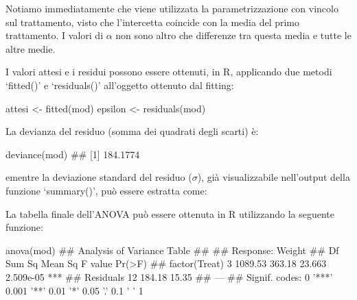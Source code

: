 \documentclass[a4paper,12pt,oneside]{book}
\newenvironment{Shaded}{}{}
\newcommand{\KeywordTok}[1]{#1}
\newcommand{\StringTok}[1]{#1}
\newcommand{\CommentTok}[1]{#1}
\newcommand{\OperatorTok}[1]{#1}
\newcommand{\NormalTok}[1]{#1}
\begin{document}
\normalsize

Notiamo immediatamente che viene utilizzata la parametrizzazione con vincolo sul trattamento, visto che l'intercetta coincide con la media del primo trattamento. I valori di \(\alpha\) non sono altro che differenze tra questa media e tutte le altre medie.

I valori attesi e i residui possono essere ottenuti, in R, applicando due metodi `fitted()' e `residuals()' all'oggetto ottenuto dal fitting:

\begin{Shaded}
\begin{Highlighting}[]
\NormalTok{attesi <-}\StringTok{ }\KeywordTok{fitted}\NormalTok{(mod)}
\NormalTok{epsilon <-}\StringTok{ }\KeywordTok{residuals}\NormalTok{(mod)}
\end{Highlighting}
\end{Shaded}

La devianza del residuo (somma dei quadrati degli scarti) è:

\begin{Shaded}
\begin{Highlighting}[]
\KeywordTok{deviance}\NormalTok{(mod)}
\CommentTok{## [1] 184.1774}
\end{Highlighting}
\end{Shaded}

ementre la deviazione standard del residuo (\(\sigma\)), già visualizzabile nell'output della funzione `summary()', può essere estratta come:

\begin{Shaded}
\end{Shaded}

La tabella finale dell'ANOVA può essere ottenuta in R utilizzando la seguente funzione:

\begin{Shaded}
\begin{Highlighting}[]
\KeywordTok{anova}\NormalTok{(mod)}
\CommentTok{## Analysis of Variance Table}
\CommentTok{## }
\CommentTok{## Response: Weight}
\CommentTok{##               Df  Sum Sq Mean Sq F value    Pr(>F)    }
\CommentTok{## factor(Treat)  3 1089.53  363.18  23.663 2.509e-05 ***}
\CommentTok{## Residuals     12  184.18   15.35                      }
\CommentTok{## ---}
\CommentTok{## Signif. codes:  0 '***' 0.001 '**' 0.01 '*' 0.05 '.' 0.1 ' ' 1}
\end{Highlighting}
\end{Shaded}
\end{document}
